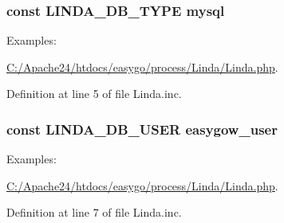 \subsubsection[{L\+I\+N\+D\+A\+\_\+\+D\+B\+\_\+\+T\+Y\+P\+E}]{\setlength{\rightskip}{0pt plus 5cm}const L\+I\+N\+D\+A\+\_\+\+D\+B\+\_\+\+T\+Y\+P\+E \textquotesingle{}mysql\textquotesingle{}}\label{_linda_8inc_a75c0048bcb27b8bf9d4e9fd1b9eb023b}
\begin{Desc}
\item[Examples\+: ]\par
\hyperlink{_c_1_2_apache24_2htdocs_2easygo_2process_2_linda_2_linda_8php-example}{C\+:/\+Apache24/htdocs/easygo/process/\+Linda/\+Linda.\+php}.\end{Desc}


Definition at line 5 of file Linda.\+inc.

\hypertarget{_linda_8inc_a713707c7fea371f7f3892136c1e852f0}{}
\subsubsection[{L\+I\+N\+D\+A\+\_\+\+D\+B\+\_\+\+U\+S\+E\+R}]{\setlength{\rightskip}{0pt plus 5cm}const L\+I\+N\+D\+A\+\_\+\+D\+B\+\_\+\+U\+S\+E\+R \textquotesingle{}easygow\+\_\+user\textquotesingle{}}\label{_linda_8inc_a713707c7fea371f7f3892136c1e852f0}
\begin{Desc}
\item[Examples\+: ]\par
\hyperlink{_c_1_2_apache24_2htdocs_2easygo_2process_2_linda_2_linda_8php-example}{C\+:/\+Apache24/htdocs/easygo/process/\+Linda/\+Linda.\+php}.\end{Desc}


Definition at line 7 of file Linda.\+inc.


